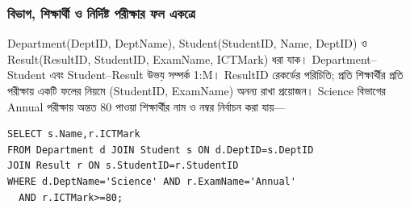 \subsubsection{বিভাগ, শিক্ষার্থী ও নির্দিষ্ট পরীক্ষার ফল একত্রে}
Department(DeptID, DeptName), Student(StudentID, Name, DeptID) ও Result(ResultID, StudentID, ExamName, ICTMark) ধরা যাক। Department–Student এবং Student–Result উভয় সম্পর্ক 1:M। ResultID রেকর্ডের পরিচিতি; প্রতি শিক্ষার্থীর প্রতি পরীক্ষায় একটি ফলের নিয়মে (StudentID, ExamName) অনন্য রাখা প্রয়োজন। Science বিভাগের Annual পরীক্ষায় অন্তত 80 পাওয়া শিক্ষার্থীর নাম ও নম্বর নির্বাচন করা যায়—
\begin{verbatim}
SELECT s.Name,r.ICTMark
FROM Department d JOIN Student s ON d.DeptID=s.DeptID
JOIN Result r ON s.StudentID=r.StudentID
WHERE d.DeptName='Science' AND r.ExamName='Annual'
  AND r.ICTMark>=80;
\end{verbatim}


